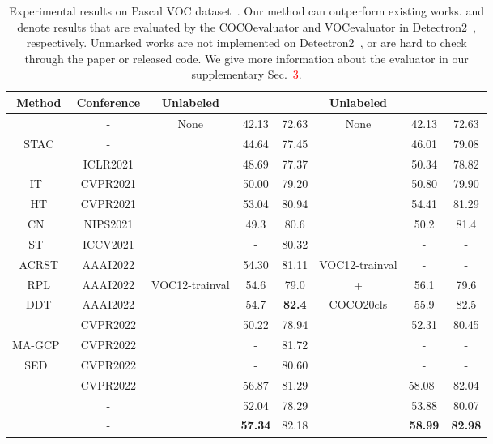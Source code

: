 \documentclass{bmvc2k}
\begin{document}
 \begin{table}[t]
    \centering
    \scriptsize
    \begin{tabular}{c|c|c|cc||c|cc}
        \toprule
         Method & Conference & Unlabeled &   &   & Unlabeled &   & \\
        \midrule
        \cite{liu2021unbiased} & - & None & 42.13 & 72.63 & None & 42.13 & 72.63 \\
        \midrule
        STAC\cite{STAC} & - & {} & 44.64 & 77.45 & {} & 46.01 & 79.08 \\
        \cite{liu2021unbiased} & ICLR2021 & {} & 48.69 & 77.37 & {} & 50.34 & 78.82 \\
        IT~\cite{instant_teaching} & CVPR2021 & {} & 50.00 & 79.20 & {} & 50.80 & 79.90 \\
        HT\cite{humbleteacher} & CVPR2021 &  {} & 53.04 & 80.94  & {} & 54.41 & 81.29 \\
        CN~\cite{combatnoise} & NIPS2021 & {} & 49.3 & 80.6 & {} & 50.2 & 81.4 \\
        ST~\cite{globalclassprototypes} & ICCV2021 & {} & - & 80.32 & {} & - & - \\
        ACRST\cite{adaptiveclass}  & AAAI2022 & {} & 54.30 & 81.11 & VOC12-trainval & - & - \\
        RPL\cite{rethink} & AAAI2022 & VOC12-trainval & 54.6 & 79.0 & + & 56.1 & 79.6 \\
        DDT\cite{zheng2022dual} & AAAI2022 & {} & 54.7 & \textbf{82.4} & COCO20cls & 55.9 & 82.5 \\
        \cite{MUM} & CVPR2022 & {} & 50.22 & 78.94 & {} & 52.31 & 80.45 \\
        MA-GCP~\cite{globalclassprototypes} & CVPR2022 & {} & - & 81.72 & {} & - & - \\
        SED~\cite{scale-equivalent} & CVPR2022 & {} & - & 80.60  & {} & - & - \\
        ~\cite{ubteacherv2} & CVPR2022 & {} & 56.87 & 81.29 & {} & 58.08\ & 82.04 \\
         & - & {} & 52.04 & 78.29 & {} & 53.88 & 80.07 \\
         & - & {} & \textbf{57.34} & 82.18 & {} & \textbf{58.99} & \textbf{82.98} \\
        \bottomrule
    \end{tabular}
    \caption{Experimental results on Pascal VOC dataset~\cite{voc}. Our method can outperform existing works.  and  denote results that are evaluated by the COCOevaluator and VOCevaluator in Detectron2~\cite{wu2019detectron2}, respectively. Unmarked works are not implemented on Detectron2~\cite{wu2019detectron2}, or are hard to check through the paper or released code. We give more information about the evaluator in our supplementary Sec.~\textcolor{red}{3}.
    }
    \label{tab:voc_exp}
\end{table}
\end{document}
